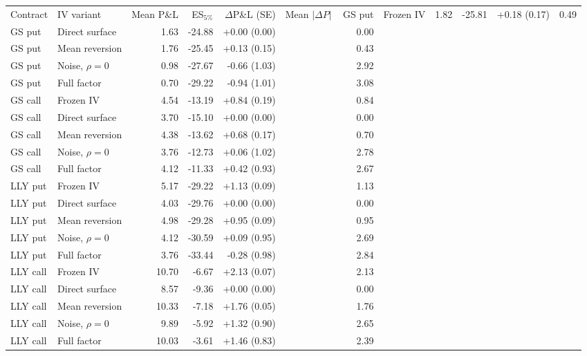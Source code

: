 \begin{tabular}{llrrrr}
\toprule
Contract & IV variant & Mean P\&L & ES$_{5\%}$ & $\Delta$P\&L (SE) & Mean $|\Delta P|$ \
\midrule
GS put & Frozen IV & 1.82 & -25.81 & +0.18 (0.17) & 0.49 \\
GS put & Direct surface & 1.63 & -24.88 & +0.00 (0.00) & 0.00 \\
GS put & Mean reversion & 1.76 & -25.45 & +0.13 (0.15) & 0.43 \\
GS put & Noise, $\rho=0$ & 0.98 & -27.67 & -0.66 (1.03) & 2.92 \\
GS put & Full factor & 0.70 & -29.22 & -0.94 (1.01) & 3.08 \\
\midrule
GS call & Frozen IV & 4.54 & -13.19 & +0.84 (0.19) & 0.84 \\
GS call & Direct surface & 3.70 & -15.10 & +0.00 (0.00) & 0.00 \\
GS call & Mean reversion & 4.38 & -13.62 & +0.68 (0.17) & 0.70 \\
GS call & Noise, $\rho=0$ & 3.76 & -12.73 & +0.06 (1.02) & 2.78 \\
GS call & Full factor & 4.12 & -11.33 & +0.42 (0.93) & 2.67 \\
\midrule
LLY put & Frozen IV & 5.17 & -29.22 & +1.13 (0.09) & 1.13 \\
LLY put & Direct surface & 4.03 & -29.76 & +0.00 (0.00) & 0.00 \\
LLY put & Mean reversion & 4.98 & -29.28 & +0.95 (0.09) & 0.95 \\
LLY put & Noise, $\rho=0$ & 4.12 & -30.59 & +0.09 (0.95) & 2.69 \\
LLY put & Full factor & 3.76 & -33.44 & -0.28 (0.98) & 2.84 \\
\midrule
LLY call & Frozen IV & 10.70 & -6.67 & +2.13 (0.07) & 2.13 \\
LLY call & Direct surface & 8.57 & -9.36 & +0.00 (0.00) & 0.00 \\
LLY call & Mean reversion & 10.33 & -7.18 & +1.76 (0.05) & 1.76 \\
LLY call & Noise, $\rho=0$ & 9.89 & -5.92 & +1.32 (0.90) & 2.65 \\
LLY call & Full factor & 10.03 & -3.61 & +1.46 (0.83) & 2.39 \\
\midrule
\end{tabular}
